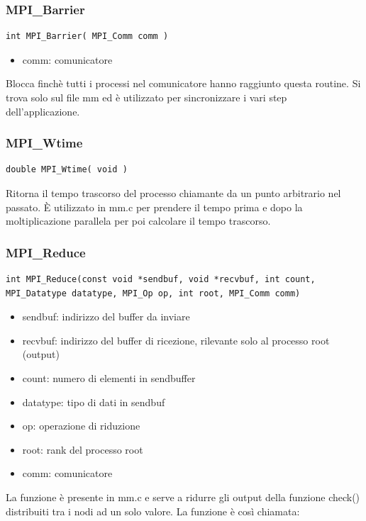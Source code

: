 \subsubsection{MPI\_Barrier}
\begin{lstlisting}
int MPI_Barrier( MPI_Comm comm )
\end{lstlisting}
\begin{itemize}
  \item comm: comunicatore
\end{itemize}

Blocca finch\`{e} tutti i processi nel comunicatore hanno raggiunto questa routine. Si trova solo sul file mm ed \`{e} utilizzato per sincronizzare i vari step dell'applicazione.

\subsubsection{MPI\_Wtime}
\begin{lstlisting}
double MPI_Wtime( void )
\end{lstlisting}

Ritorna il tempo trascorso del processo chiamante da un punto arbitrario nel passato. \`{E} utilizzato in mm.c per prendere il tempo prima e dopo la moltiplicazione parallela per poi calcolare il tempo trascorso.

\subsubsection{MPI\_Reduce}
\begin{lstlisting}
int MPI_Reduce(const void *sendbuf, void *recvbuf, int count, MPI_Datatype datatype, MPI_Op op, int root, MPI_Comm comm)
\end{lstlisting}
\begin{itemize}
  \item sendbuf: indirizzo del buffer da inviare
  \item recvbuf: indirizzo del buffer di ricezione, rilevante solo al processo root (output)
  \item count: numero di elementi in sendbuffer
  \item datatype: tipo di dati in sendbuf
  \item op: operazione di riduzione
  \item root: rank del processo root
  \item comm: comunicatore
\end{itemize}

La funzione \`{e} presente in mm.c e serve a ridurre gli output della funzione check() distribuiti tra i nodi ad un solo valore. La funzione \`{e} cos\`{i} chiamata:


